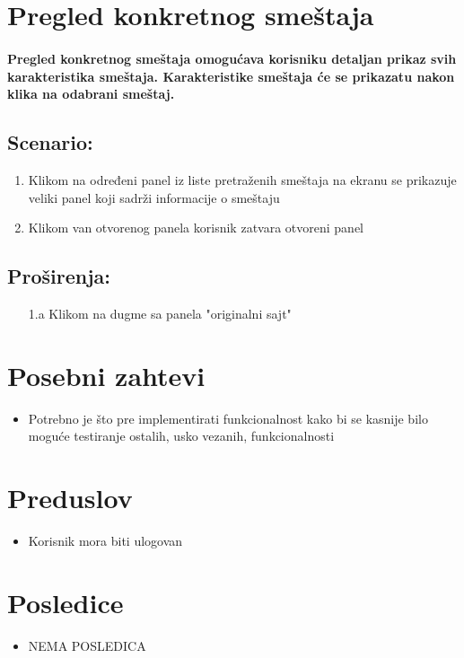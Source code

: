\section{Pregled konkretnog smeštaja}
\paragraph{Pregled konkretnog smeštaja omogućava korisniku detaljan prikaz svih karakteristika smeštaja. Karakteristike smeštaja će se prikazatu nakon klika na odabrani smeštaj.
}

\subsection{\textbf{Scenario:}}
\begin{enumerate}
    \item Klikom na određeni panel iz liste pretraženih smeštaja na ekranu se prikazuje veliki panel koji sadrži informacije o smeštaju
    \item Klikom van otvorenog panela korisnik zatvara otvoreni panel
\end{enumerate}
\newpage
\subsection{\textbf{Proširenja:}}

\begin{enumerate}
\color{Maroon}
  \item[1.a] Klikom na dugme sa panela "originalni sajt"
\end{enumerate}
\section{Posebni zahtevi}
\begin{itemize}
    \item Potrebno je što pre implementirati funkcionalnost kako bi se kasnije bilo moguće testiranje ostalih, usko vezanih, funkcionalnosti
\end{itemize}
\section{Preduslov}
\begin{itemize}
    \item Korisnik mora biti ulogovan
\end{itemize}

\section{Posledice}
\begin{itemize}
    \item \color{Maroon}NEMA POSLEDICA
\end{itemize}
